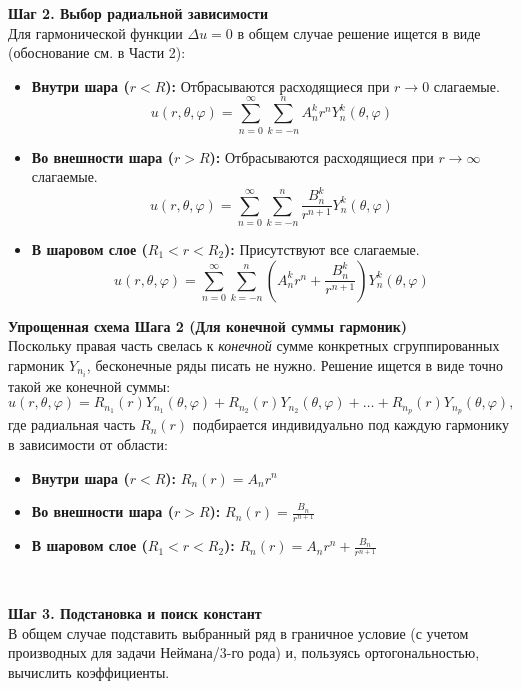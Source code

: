 \documentclass[a4paper,10pt]{article}
\begin{document}
\textbf{Шаг 2. Выбор радиальной зависимости} \\
Для гармонической функции $\Delta u = 0$ в общем случае решение ищется в виде (обоснование см. в Части 2):
\begin{itemize}
    \item \textbf{Внутри шара ($r < R$):} Отбрасываются расходящиеся при $r \to 0$ слагаемые.
    \[ u(r, \theta, \varphi) = \sum_{n=0}^\infty \sum_{k=-n}^n A_n^k r^n Y_n^k(\theta, \varphi) \]
    \item \textbf{Во внешности шара ($r > R$):} Отбрасываются расходящиеся при $r \to \infty$ слагаемые.
    \[ u(r, \theta, \varphi) = \sum_{n=0}^\infty \sum_{k=-n}^n \frac{B_n^k}{r^{n+1}} Y_n^k(\theta, \varphi) \]
    \item \textbf{В шаровом слое ($R_1 < r < R_2$):} Присутствуют все слагаемые.
    \[ u(r, \theta, \varphi) = \sum_{n=0}^\infty \sum_{k=-n}^n \left( A_n^k r^n + \frac{B_n^k}{r^{n+1}} \right) Y_n^k(\theta, \varphi) \]
\end{itemize}

\textbf{Упрощенная схема Шага 2 (Для конечной суммы гармоник)} \\
Поскольку правая часть свелась к \textit{конечной} сумме конкретных сгруппированных гармоник $Y_{n_i}$, бесконечные ряды писать не нужно. Решение ищется в виде точно такой же конечной суммы:
\[ u(r, \theta, \varphi) = R_{n_1}(r)Y_{n_1}(\theta, \varphi) + R_{n_2}(r)Y_{n_2}(\theta, \varphi) + \dots + R_{n_p}(r)Y_{n_p}(\theta, \varphi), \]
где радиальная часть $R_n(r)$ подбирается индивидуально под каждую гармонику в зависимости от области: 
\begin{itemize}
    \item \textbf{Внутри шара ($r < R$):} $R_n(r) = A_n r^n$
    \item \textbf{Во внешности шара ($r > R$):} $R_n(r) = \frac{B_n}{r^{n+1}}$
    \item \textbf{В шаровом слое ($R_1 < r < R_2$):} $R_n(r) = A_n r^n + \frac{B_n}{r^{n+1}}$
\end{itemize}

\

\textbf{Шаг 3. Подстановка и поиск констант} \\
В общем случае подставить выбранный ряд в граничное условие (с учетом производных для задачи Неймана/3-го рода) и, пользуясь ортогональностью, вычислить коэффициенты.

\
\end{document}
